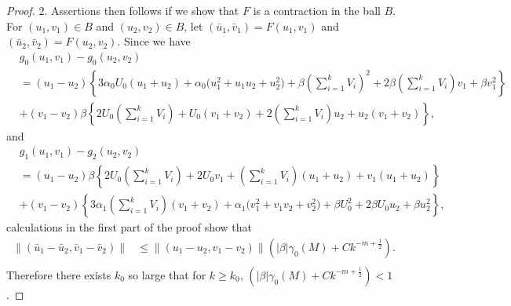 \documentclass{amsart}
\theoremstyle{definition}
\theoremstyle{remark}
\numberwithin{equation}{section}
\begin{document}
\begin{proof}
2. Assertions then follows if we show that $F$ is a contraction in the ball $B$. For $(u_1,v_1)\in B$ and $(u_2,v_2) \in B$, let $(\bar{u}_1, \bar{v}_1) = F(u_1,v_1)$ and $(\bar{u}_2, \bar{v}_2) = F(u_2,v_2)$. Since we have 
\begin{align*}
&g_0(u_1,v_1) - g_0(u_2,v_2)\\
&= {(u_1 - u_2)}\left\{ 3\alpha_0U_0(u_1+u_2) + \alpha_0\big(u_1^2+u_1u_2 + u_2^2\big) + \beta \left(\sum_{i=1}^k V_{i}\right)^2 + 2\beta \left(\sum_{i=1}^k V_{i}\right) v_1 + \beta v_1^2\right\}\\
&+  {(v_1-v_2)}\beta\left\{ 2U_0 \left(\sum_{i=1}^k V_{i}\right) + U_0(v_1+v_2) + 2\left( \sum_{i=1}^k V_{i}\right)u_2 + u_2(v_1+v_2)\right\},\end{align*}and
\begin{align*}
&g_1(u_1,v_1) - g_2(u_2,v_2)\\
&= {(u_1 - u_2)}\beta\left\{ 2U_0\left(\sum_{i=1}^k V_{i}\right) + 2U_0v_1 + \left(\sum_{i=1}^k V_{i}\right)(u_1+u_2) +v_1(u_1+u_2)\right\}\\
&+  {(v_1-v_2)}\left\{ 3\alpha_1\left(\sum_{i=1}^k V_{i}\right)(v_1+v_2) + \alpha_1\big(v_1^2 + v_1v_2 + v_2^2\big) + \beta U_0^2 + 2\beta U_0u_2 + \beta u_2^2\right\},
\end{align*}
calculations in the first part of the proof show that
\begin{align*}
 \|(\bar{u}_1 - \bar{u}_2, \bar{v}_1 - \bar{v}_2)\| &\le \|(u_1 - u_2,v_1-v_2)\| \left( |\beta|\gamma_0(M) + Ck^{-m+ \frac{1}{2}}\right). \\
\end{align*}
Therefore there exists $k_0$  so large that for $k \ge k_0$, $\left( |\beta|\gamma_0(M) + Ck^{-m+ \frac{1}{2}}\right) < 1$.

\end{proof}
\end{document}
